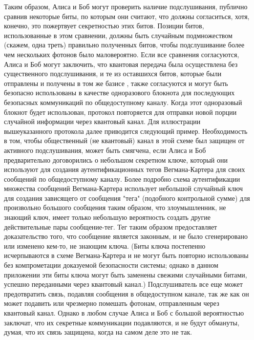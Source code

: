 Таким образом, Алиса и Боб могут проверить наличие подслушивания, публично сравнив некоторые биты, по которым они считают, что должны согласиться, хотя, конечно, это пожертвует секретностью этих битов. Позиции битов, использованные в этом сравнении, должны быть случайным подмножеством (скажем, одна треть) правильно полученных битов, чтобы подслушивание более чем нескольких фотонов было маловероятно. Если все сравнения согласуются, Алиса и Боб могут заключить, что квантовая передача была осуществлена без существенного подслушивания, и те из оставшихся битов, которые были отправлены и получены в том же базисе , также согласуются и могут быть безопасно использованы в качестве одноразового блокнота для последующих безопасных коммуникаций по общедоступному каналу. Когда этот одноразовый блокнот будет использован, протокол повторяется для отправки новой порции случайной информации через квантовый канал. Для иллюстрации вышеуказанного протокола далее приводится следующий пример. Необходимость в том, чтобы общественный (не квантовый) канал в этой схеме был защищен от активного подслушивания, может быть смягчена, если Алиса и Боб предварительно договорились о небольшом секретном ключе, который они используют для создания аутентификационных тегов Вегмана-Картера для своих сообщений по общедоступному каналу. Более подробно схема аутентификации множества сообщений Вегмана-Картера использует небольшой случайный ключ для создания зависящего от сообщения "тега" (подобного контрольной сумме) для произвольно большого сообщения таким образом, что злоумышленник, не знающий ключ, имеет только небольшую вероятность создать другие действительные пары сообщение-тег. Тег таким образом предоставляет доказательство того, что сообщение является законным, и не было сгенерировано или изменено кем-то, не знающим ключа. (Биты ключа постепенно исчерпываются в схеме Вегмана-Картера и не могут быть повторно использованы без компрометации доказуемой безопасности системы; однако в данном приложении эти биты ключа могут быть заменены свежими случайными битами, успешно переданными через квантовый канал.) Подслушиватель все еще может предотвратить связь, подавляя сообщения в общедоступном канале, так же как он может подавить или чрезмерно помешать фотонам, отправленным через квантовый канал. Однако в любом случае Алиса и Боб с большой вероятностью заключат, что их секретные коммуникации подавляются, и не будут обмануты, думая, что их связь защищена, когда на самом деле это не так.


